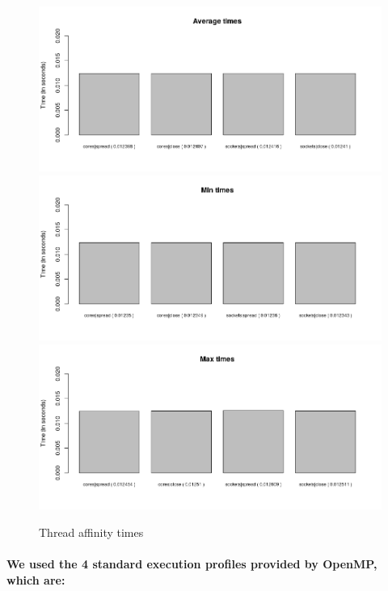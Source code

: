 \documentclass{article}
\begin{document}
\begin{figure}[h]
\caption{Thread affinity times}
\centering
\includegraphics[width=\textwidth]{times_average}
\includegraphics[width=\textwidth]{times_min}
\includegraphics[width=\textwidth]{times_max}
\end{figure}

\paragraph{We used the 4 standard execution profiles provided by OpenMP, which are:}
\end{document}
